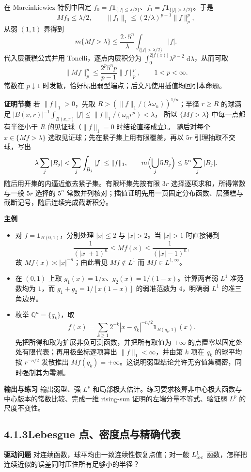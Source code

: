 \documentclass[11pt,a4paper]{ctexart}
\newcommand{\dd}{\,\mathrm d}
\newcommand{\planitem}[1]{\par\smallskip\noindent\textcolor{deepblue}{\textbf{#1}}\quad}
\newcommand{\unithead}[2]{\subsection{#1\quad #2}}
\begin{document}
在 Marcinkiewicz 特例中固定
$f_0=f\mathbf1_{\{|f|\le\lambda/2\}}$、$f_1=f\mathbf1_{\{|f|>\lambda/2\}}$。于是
\[
 M f_0\le\lambda/2,\qquad
 \|f_1\|_1\le(2/\lambda)^{p-1}\|f\|_p^p,
\]
从弱 $(1,1)$ 界得到
\[
 m\{Mf>\lambda\}\le\frac{2\cdot5^n}{\lambda}
 \int_{\{|f|>\lambda/2\}}|f|.
\]
代入层蛋糕公式并用 Tonelli，逐点内层积分为
$\int_0^{2|f(x)|}\lambda^{p-2}\,\dd\lambda$，从而可取
\[
 \|Mf\|_p^p\le \frac{2^p5^n p}{p-1}\|f\|_p^p,
 \qquad1<p<\infty.
\]
常数在 $p\downarrow1$ 时发散，恰好标出弱型端点；后文凡使用插值均回引本命题。

\planitem{证明节奏}
若 $\|f\|_1>0$，先取
$R>(\|f\|_1/(\lambda\omega_n))^{1/n}$；半径 $r\ge R$ 的球满足
$|B(x,r)|^{-1}\int_{B(x,r)}|f|\le\|f\|_1/(\omega_nr^n)<\lambda$，
所以 $\{Mf>\lambda\}$ 中每一点都有半径小于 $R$ 的见证球（$\|f\|_1=0$ 时结论直接成立）。
随后对每个 $x\in\{Mf>\lambda\}$ 选取见证球；先在紧子集上用有限覆盖，再以 $5r$ 引理抽取不交球，写出
\[
\lambda\sum_j|B_j|<\sum_j\int_{B_j}|f|\le\|f\|_1,
\qquad
m\Bigl(\bigcup_j5B_j\Bigr)\le5^n\sum_j|B_j|.
\]
随后用开集的内逼近撤去紧子集。有限坏集先按有限 $3r$ 选择逐项求和，所得常数与一般
$5r$ 选择的 $5^n$ 常数并列核对；插值证明先用一页固定分布函数、层蛋糕与截断记号，随后连续完成截断积分。

\planitem{主例}
\begin{itemize}
\item 对 $f=\mathbf1_{B(0,1)}$，分别处理 $|x|\le2$ 与 $|x|>2$。当 $|x|>1$ 时直接得到
\[
 \frac1{(|x|+1)^n}\le Mf(x)\le
\frac1{(|x|-1)^n},
\]
故 $Mf(x)\asymp|x|^{-n}$；由此看见 $Mf\notin L^1$ 而 $Mf\in L^{1,\infty}$。
\item 在 $(0,1)$ 上取 $g_1(x)=1/x$、$g_2(x)=1/(1-x)$。计算两者弱 $L^1$ 准范数均为 $1$，而 $g_1+g_2=1/[x(1-x)]$ 的弱准范数为 $4$，明确弱 $L^1$ 的准三角边界。
\item 枚举 $\mathbb Q^n=\{q_k\}$，取
\[
f(x)=\sum_{k\ge1}2^{-k}|x-q_k|^{-n/2}
\mathbf1_{B(q_k,1)}(x).
\]
先把所得和取为扩展非负可测函数，并把所有取值为 $+\infty$ 的点置零以固定处处有限代表；再用极坐标逐项算出 $\|f\|_1<\infty$，并由第 $k$ 项在 $q_k$ 的球平均按 $r^{-n/2}$ 发散推出 $Mf(q_k)=+\infty$。这说明弱型结论允许无穷值集稠密，同时强制其为零测。
\end{itemize}

\planitem{输出与练习}
输出弱型、强 $L^p$ 和局部极大估计。练习要求核算非中心极大函数与中心版本的常数比较、完成一维 rising-sun 证明的左端分量不等式、验证弱 $L^p$ 的尺度不变性。

\unithead{4.1.3}{Lebesgue 点、密度点与精确代表}

\planitem{驱动问题}
对连续函数，球平均由一致连续性恢复点值；对一般 $L^1_{\rm loc}$ 函数，怎样把连续近似的误差同时压住所有足够小的半径？
\end{document}
